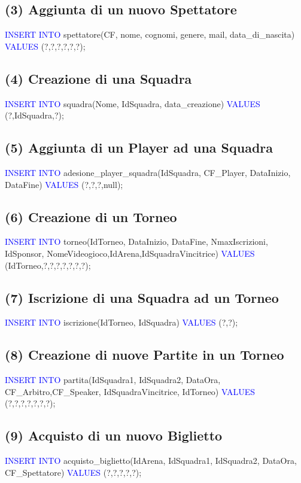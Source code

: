 \documentclass[a4paper,12pt]{report}
\begin{document}
\subsection*{(3) Aggiunta di un nuovo Spettatore}
\textcolor{blue}{INSERT INTO} spettatore(CF, nome, cognomi, genere, mail, data\_di\_nascita)
\textcolor{blue}{VALUES} (?,?,?,?,?,?);

\subsection*{(4) Creazione di una Squadra}
\textcolor{blue}{INSERT INTO} squadra(Nome, IdSquadra, data\_creazione)
\textcolor{blue}{VALUES} (?,IdSquadra,?);

\subsection*{(5) Aggiunta di un Player ad una Squadra}
\textcolor{blue}{INSERT INTO} adesione\_player\_squadra(IdSquadra, CF\_Player, DataInizio, DataFine)
\textcolor{blue}{VALUES} (?,?,?,null);

\subsection*{(6) Creazione di un Torneo}
\textcolor{blue}{INSERT INTO} torneo(IdTorneo, DataInizio, DataFine, NmaxIscrizioni, IdSponsor, NomeVideogioco,IdArena,IdSquadraVincitrice)
\textcolor{blue}{VALUES} (IdTorneo,?,?,?,?,?,?,?);

\subsection*{(7) Iscrizione di una Squadra ad un Torneo}
\textcolor{blue}{INSERT INTO} iscrizione(IdTorneo, IdSquadra)
\textcolor{blue}{VALUES} (?,?);

\subsection*{(8) Creazione di nuove Partite in un Torneo}
\textcolor{blue}{INSERT INTO} partita(IdSquadra1, IdSquadra2, DataOra, CF\_Arbitro,CF\_Speaker, IdSquadraVincitrice, IdTorneo)
\textcolor{blue}{VALUES} (?,?,?,?,?,?,?);

\subsection*{(9) Acquisto di un nuovo Biglietto}
\textcolor{blue}{INSERT INTO} acquisto\_biglietto(IdArena, IdSquadra1, IdSquadra2, DataOra, CF\_Spettatore)
\textcolor{blue}{VALUES} (?,?,?,?,?);
\end{document}

